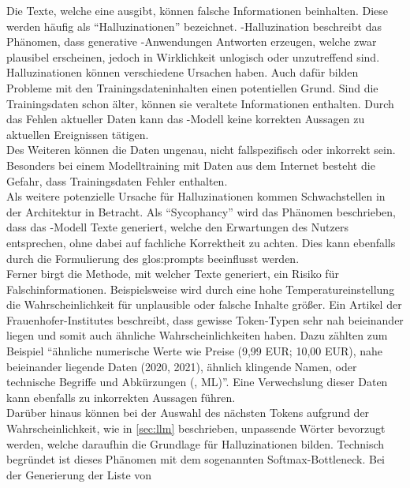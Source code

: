 \documentclass[../main.tex]{subfiles}
\begin{document}
Die Texte, welche eine  ausgibt, können falsche Informationen beinhalten. Diese werden häufig als "`Halluzinationen"' bezeichnet. -Halluzination beschreibt 
das Phänomen, dass generative -Anwendungen Antworten erzeugen, welche zwar plausibel erscheinen, jedoch in Wirklichkeit unlogisch oder unzutreffend sind\cite{hallucinationForewarning}.\\
Halluzinationen können verschiedene Ursachen haben. Auch dafür bilden Probleme mit den Trainingsdateninhalten einen potentiellen Grund. Sind die Trainingsdaten schon älter,
können sie veraltete Informationen enthalten. Durch das Fehlen aktueller Daten kann das -Modell keine korrekten Aussagen zu aktuellen Ereignissen tätigen.\\ Des 
Weiteren können die Daten ungenau, nicht fallspezifisch oder inkorrekt sein. Besonders bei einem Modelltraining mit Daten aus dem Internet besteht die Gefahr, dass 
Trainingsdaten Fehler enthalten.\\ Als weitere potenzielle Ursache für Halluzinationen kommen Schwachstellen in der Architektur in Betracht. Als "`Sycophancy"' wird das 
Phänomen beschrieben, dass das -Modell Texte generiert, welche den Erwartungen des Nutzers entsprechen, ohne dabei auf fachliche Korrektheit zu achten. Dies kann ebenfalls 
durch die Formulierung des \gls{glos:prompt}s beeinflusst werden.\cite{allgemHalluzinationen} \\
Ferner birgt die Methode, mit welcher  Texte generiert, ein Risiko für Falschinformationen. Beispielsweise wird durch eine hohe Temperatureinstellung die 
Wahrscheinlichkeit für unplausible oder falsche Inhalte größer. Ein Artikel der Frauenhofer-Institutes beschreibt, dass gewisse Token-Typen sehr nah beieinander liegen 
und somit auch ähnliche Wahrscheinlichkeiten haben. Dazu zählten zum Beispiel "`ähnliche numerische Werte wie Preise (9,99 EUR; 10,00 EUR), nahe beieinander liegende 
Daten (2020, 2021), ähnlich klingende Namen, oder technische Begriffe und Abkürzungen (, ML)"'\cite{halluzinationenFraunhofer}. Eine Verwechslung dieser Daten kann ebenfalls zu inkorrekten Aussagen 
führen.\\
Darüber hinaus können bei der Auswahl des nächsten Tokens aufgrund der Wahrscheinlichkeit, wie in \autoref{sec:llm}  beschrieben, unpassende Wörter bevorzugt werden, welche 
daraufhin die Grundlage für Halluzinationen bilden. Technisch begründet ist dieses Phänomen mit dem sogenannten Softmax-Bottleneck. Bei der Generierung der Liste von 
\end{document}
